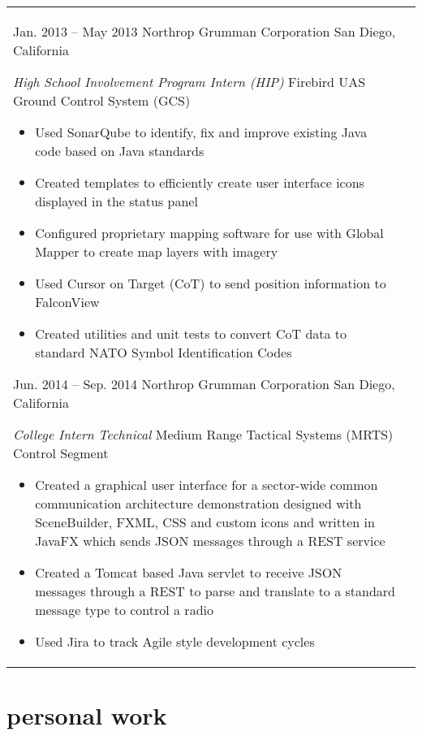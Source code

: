 \documentclass[print]{friggeri-cv} %
\makeatletter
\renewenvironment{entrylist}{%
	\par\begin{tabular*}{\textwidth}{@{\extracolsep{\fill}}ll}
	}{%
\end{tabular*}\par
}
\makeatother
\begin{document}
\begin{entrylist}
\entry
{Jan. 2013 -- May 2013}
{Northrop Grumman Corporation}
{San Diego, California}
{\emph{High School Involvement Program Intern (HIP)}
Firebird UAS Ground Control System (GCS)
\begin{itemize}
\item Used SonarQube to identify, fix and improve existing Java code based on Java standards
\item Created templates to efficiently create user interface icons displayed in the status panel
\item Configured proprietary mapping software for use with Global Mapper to create map layers with imagery
\item Used Cursor on Target (CoT) to send position information to FalconView
\item Created utilities and unit tests to convert CoT data to standard NATO Symbol Identification Codes
\end{itemize}}
\entry
{Jun. 2014 -- Sep. 2014}
{Northrop Grumman Corporation}
{San Diego, California}
{\emph{College Intern Technical}
Medium Range Tactical Systems (MRTS)  Control Segment
\begin{itemize}
\item Created a graphical user interface for a sector-wide common communication architecture demonstration designed with SceneBuilder, FXML, CSS and custom icons and written in JavaFX which sends JSON messages through a REST service
\item Created a Tomcat based Java servlet to receive JSON messages through a REST to parse and translate to a standard message type to control a radio
\item Used Jira to track Agile style development cycles
\end{itemize}}
\end{entrylist}


\section{personal work}
\end{document}
